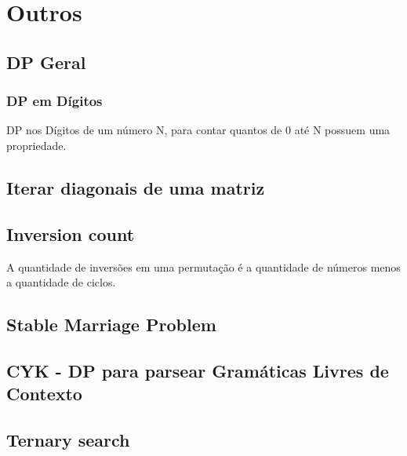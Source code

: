 \section{Outros}

\subsection{DP Geral}
\subsubsection{DP em D\'{i}gitos}
DP nos D\'{i}gitos de um n\'{u}mero N, para contar quantos de 0 at\'{e} N possuem uma propriedade.

\divisor

\subsection{Iterar diagonais de uma matriz}
\divisor

\subsection{Inversion count}
A quantidade de invers\~{o}es em uma permuta\c{c}\~{a}o \'{e} a quantidade de n\'{u}meros menos a quantidade de ciclos.

\divisor

\subsection{Stable Marriage Problem}

\divisor

\subsection{CYK - DP para parsear Gram\'{a}ticas Livres de Contexto}

\divisor

\subsection{Ternary search}
